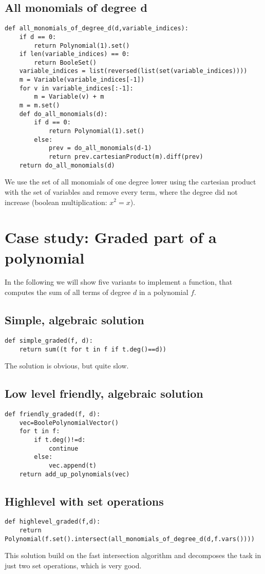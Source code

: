 \documentclass[]{article}
\begin{document}
\subsection{All monomials of degree d}
\begin{verbatim}
def all_monomials_of_degree_d(d,variable_indices):
    if d == 0:
        return Polynomial(1).set()
    if len(variable_indices) == 0:
        return BooleSet()
    variable_indices = list(reversed(list(set(variable_indices))))
    m = Variable(variable_indices[-1])
    for v in variable_indices[:-1]:
        m = Variable(v) + m
    m = m.set()
    def do_all_monomials(d):
        if d == 0:
            return Polynomial(1).set()
        else:
            prev = do_all_monomials(d-1)
            return prev.cartesianProduct(m).diff(prev)
    return do_all_monomials(d)
\end{verbatim}
We use the set of all monomials of one degree lower using the cartesian product with the set of variables and remove every term, where the degree did not increase (boolean multiplication: $x^2=x$).

\section{Case study: Graded part of a polynomial}
In the following we will show five variants to implement a function, that computes the sum of all terms of degree $d$ in a polynomial $f$.
\subsection{Simple, algebraic solution}
\begin{verbatim}
def simple_graded(f, d):
    return sum((t for t in f if t.deg()==d))   
\end{verbatim}
The solution is obvious, but quite slow.
\subsection{Low level friendly, algebraic solution}
\begin{verbatim}
def friendly_graded(f, d):
    vec=BoolePolynomialVector()
    for t in f:
        if t.deg()!=d:
            continue
        else:
            vec.append(t)
    return add_up_polynomials(vec)
\end{verbatim}
\subsection{Highlevel with set operations}
\begin{verbatim}
def highlevel_graded(f,d):
    return Polynomial(f.set().intersect(all_monomials_of_degree_d(d,f.vars())))
\end{verbatim}
This solution build on the fast intersection algorithm and decomposes the task in just two set operations, which is very good.
\end{document}
